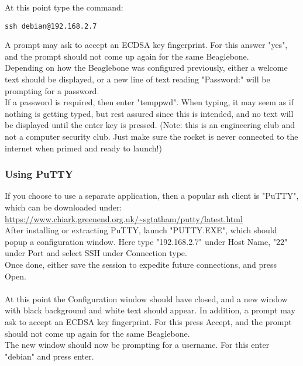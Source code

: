 \documentclass[12pt,article]{memoir}
\begin{document}
\noindent
At this point type the command:
\begin{lstlisting}
ssh debian@192.168.2.7
\end{lstlisting}

\noindent
A prompt may ask to accept an ECDSA key fingerprint. For this answer "yes", and the prompt should not come up again for the same Beaglebone.\\

\noindent
Depending on how the Beaglebone was configured previously, either a welcome text should be displayed, or a new line of text reading "Password:" will be prompting for a password.\\
If a password is required, then enter "temppwd". When typing, it may seem as if nothing is getting typed, but rest assured since this is intended, and no text will be displayed until the enter key is pressed. (Note: this is an engineering club and not a computer security club. Just make sure the rocket is never connected to the internet when primed and ready to launch!)

\subsubsection{Using PuTTY}
If you choose to use a separate application, then a popular ssh client is "PuTTY", which can be downloaded under:\\
\url{https://www.chiark.greenend.org.uk/~sgtatham/putty/latest.html}\\

\noindent
After installing or extracting PuTTY, launch "PUTTY.EXE", which should popup a configuration window. Here type "192.168.2.7" under Host Name, "22" under Port and select SSH under Connection type.\\
Once done, either save the session to expedite future connections, and press Open.\\\\

\noindent
At this point the Configuration window should have closed, and a new window with black background and white text should appear. In addition, a prompt may ask to accept an ECDSA key fingerprint. For this press Accept, and the prompt should not come up again for the same Beaglebone.\\

\noindent
The new window should now be prompting for a username. For this enter "debian" and press enter.\\
\end{document}
